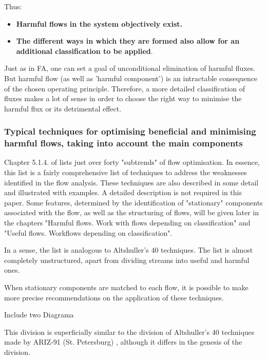 \documentclass[a4paper,11pt]{article}
\begin{document}
Thus:
\begin{itemize}
\item \textbf{Harmful flows in the system objectively exist.}
\item \textbf{The different ways in which they are formed also allow for an
  additional classification to be applied}.
\end{itemize}
Just as in FA, one can set a goal of unconditional elimination of harmful
fluxes. But harmful flow (as well as 'harmful component') is an intractable
consequence of the chosen operating principle. Therefore, a more detailed
classification of fluxes makes a lot of sense in order to choose the right way
to minimise the harmful flux or its detrimental effect.

\subsubsection{Typical techniques for optimising beneficial and minimising
  harmful flows, taking into account the main components}

Chapter 5.1.4. of \cite{B6} lists just over forty "subtrends" of flow
optimisation. In essence, this list is a fairly comprehensive list of
techniques to address the weaknesses identified in the flow analysis. These
techniques are also described in some detail and illustrated with examples. A
detailed description is not required in this paper. Some features, determined
by the identification of "stationary" components associated with the flow, as
well as the structuring of flows, will be given later in the chapters "Harmful
flows. Work with flows depending on classification" and "Useful flows.
Workflows depending on classification".

In a sense, the list is analogous to Altshuller's 40 techniques. The list is
almost completely unstructured, apart from dividing streams into useful and
harmful ones.

When stationary components are matched to each flow, it is possible to make
more precise recommendations on the application of these techniques.
\begin{center}
  Include two Diagrama
\end{center}

This division is superficially similar to the division of Altshuller's 40
techniques made by ARIZ-91 (St. Petersburg) \cite{B14}, although it differs in
the genesis of the division.
\end{document}
